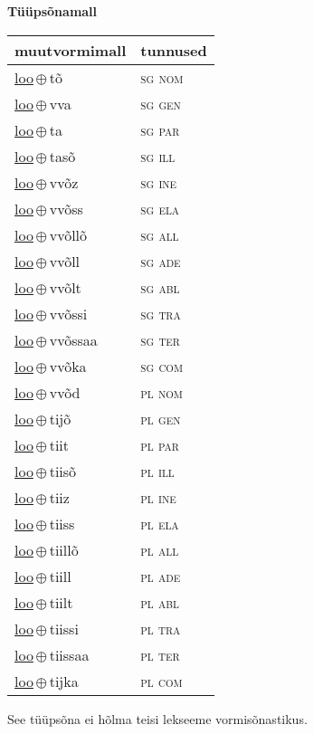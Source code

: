

\vspace{3.5em}
\noindent \begin{minipage}{\textwidth}
\noindent \textbf{Tüüpsõnamall \,}\\

\begin{sideways}
\begin{tabular}{l l}
muutvormimall & tunnused \\
\hline
\underline{loo}\,$\oplus$\,tõ & \textsc{ sg nom } \\
\underline{loo}\,$\oplus$\,vva & \textsc{ sg gen } \\
\underline{loo}\,$\oplus$\,ta & \textsc{ sg par } \\
\underline{loo}\,$\oplus$\,tasõ & \textsc{ sg ill } \\
\underline{loo}\,$\oplus$\,vvõz & \textsc{ sg ine } \\
\underline{loo}\,$\oplus$\,vvõss & \textsc{ sg ela } \\
\underline{loo}\,$\oplus$\,vvõllõ & \textsc{ sg all } \\
\underline{loo}\,$\oplus$\,vvõll & \textsc{ sg ade } \\
\underline{loo}\,$\oplus$\,vvõlt & \textsc{ sg abl } \\
\underline{loo}\,$\oplus$\,vvõssi & \textsc{ sg tra } \\
\underline{loo}\,$\oplus$\,vvõssaa & \textsc{ sg ter } \\
\underline{loo}\,$\oplus$\,vvõka & \textsc{ sg com } \\
\underline{loo}\,$\oplus$\,vvõd & \textsc{ pl nom } \\
\underline{loo}\,$\oplus$\,tijõ & \textsc{ pl gen } \\
\underline{loo}\,$\oplus$\,tiit & \textsc{ pl par } \\
\underline{loo}\,$\oplus$\,tiisõ & \textsc{ pl ill } \\
\underline{loo}\,$\oplus$\,tiiz & \textsc{ pl ine } \\
\underline{loo}\,$\oplus$\,tiiss & \textsc{ pl ela } \\
\underline{loo}\,$\oplus$\,tiillõ & \textsc{ pl all } \\
\underline{loo}\,$\oplus$\,tiill & \textsc{ pl ade } \\
\underline{loo}\,$\oplus$\,tiilt & \textsc{ pl abl } \\
\underline{loo}\,$\oplus$\,tiissi & \textsc{ pl tra } \\
\underline{loo}\,$\oplus$\,tiissaa & \textsc{ pl ter } \\
\underline{loo}\,$\oplus$\,tijka & \textsc{ pl com } \\
\end{tabular}
\end{sideways}
\label{tab:tüüpsõnamall-lootõ}

\end{minipage}

 
\vspace{1em}
\noindent See tüüpsõna ei hõlma teisi lekseeme vormi\-sõnastikus.
